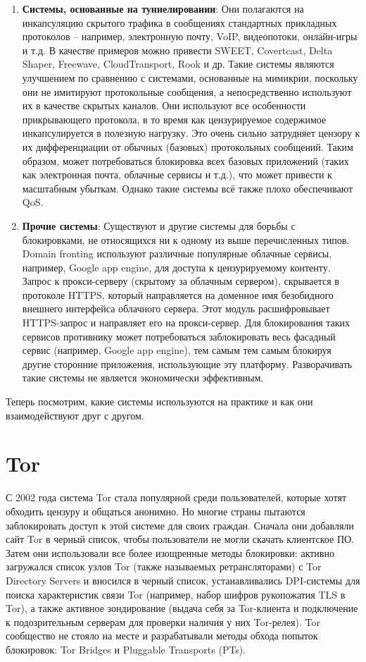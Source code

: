 \begin{enumerate}
    \item \textbf{Системы, основанные на туннелировании}:
    Они полагаются на инкапсуляцию скрытого трафика в сообщениях стандартных прикладных протоколов – например, электронную почту, VoIP, видеопотоки, онлайн-игры и т.д.
    В качестве примеров можно привести SWEET, Covertcast, Delta Shaper, Freewave, CloudTransport, Rook и др.
    Такие системы являются улучшением по сравнению с системами, основанные на мимикрии, поскольку они не имитируют протокольные сообщения,
    а непосредственно используют их в качестве скрытых каналов.
    Они используют все особенности прикрывающего протокола, в то время как цензурируемое содержимое инкапсулируется в полезную нагрузку.
    Это очень сильно затрудняет цензору к их дифференциации от обычных (базовых) протокольных сообщений.
    Таким образом, может потребоваться блокировка всех базовых приложений (таких как электронная почта, облачные сервисы и т.д.), что может привести к масштабным убыткам.
    Однако такие системы всё также плохо обеспечивают QoS.

    \item \textbf{Прочие системы}:
    Существуют и другие системы для борьбы с блокировками, не относящихся ни к одному из выше перечисленных типов.
    Domain fronting  используют различные популярные облачные сервисы, например, Google app engine, для доступа к цензурируемому контенту.
    Запрос к прокси-серверу (скрытому за облачным сервером), скрывается в протоколе HTTPS, который направляется на доменное имя безобидного внешнего интерфейса облачного сервера.
    Этот модуль расшифровывает HTTPS-запрос и направляет его на прокси-сервер.
    Для блокирования таких сервисов противнику может потребоваться заблокировать весь фасадный сервис (например, Google app engine), тем самым
    тем самым блокируя другие сторонние приложения, использующие эту платформу. Разворачивать такие системы не является экономически эффективным.


\end{enumerate}

Теперь посмотрим, какие системы используются на практике и как они взаимодействуют друг с другом.

\section{Tor}

С 2002 года система Tor стала популярной среди пользователей, которые хотят обходить цензуру и общаться анонимно.
Но многие страны пытаются заблокировать доступ к этой системе для своих граждан.
Сначала они добавляли сайт Tor в черный список, чтобы пользователи не могли скачать клиентское ПО.
Затем они использовали все более изощренные методы блокировки:
активно загружался список узлов Tor (также называемых ретрансляторами) с Tor Directory Servers и вносился в черный список,
устанавливались DPI-системы для поиска характеристик связи Tor (например, набор шифров рукопожатия TLS в Tor), а также активное зондирование
(выдача себя за Tor-клиента и подключение к подозрительным серверам для проверки наличия у них Tor-релея).
Tor сообщество не стояло на месте и разрабатывали методы обхода попыток блокировок: Tor Bridges и Pluggable Transports (PTs).

